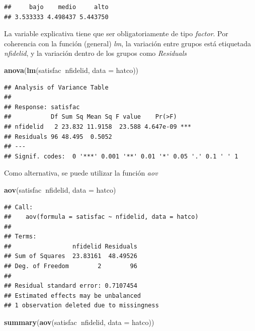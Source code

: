 \documentclass[]{book}
\newenvironment{Shaded}{\begin{snugshade}}{\end{snugshade}}
\newcommand{\DataTypeTok}[1]{\textcolor[rgb]{0.13,0.29,0.53}{#1}}
\newcommand{\KeywordTok}[1]{\textcolor[rgb]{0.13,0.29,0.53}{\textbf{#1}}}
\newcommand{\NormalTok}[1]{#1}
\newcommand{\OperatorTok}[1]{\textcolor[rgb]{0.81,0.36,0.00}{\textbf{#1}}}
\begin{document}
\begin{verbatim}
##     bajo    medio     alto 
## 3.533333 4.498437 5.443750
\end{verbatim}

La variable explicativa tiene que ser obligatoriamente de tipo \emph{factor}.
Por coherencia con la función (general) \emph{lm}, la variación entre grupos
está etiquetada \emph{nfidelid}, y la variación dentro de los grupos como
\emph{Residuals}

\begin{Shaded}
\begin{Highlighting}[]
\KeywordTok{anova}\NormalTok{(}\KeywordTok{lm}\NormalTok{(satisfac}\OperatorTok{~}\NormalTok{nfidelid, }\DataTypeTok{data =}\NormalTok{ hatco))}
\end{Highlighting}
\end{Shaded}

\begin{verbatim}
## Analysis of Variance Table
## 
## Response: satisfac
##           Df Sum Sq Mean Sq F value    Pr(>F)    
## nfidelid   2 23.832 11.9158  23.588 4.647e-09 ***
## Residuals 96 48.495  0.5052                      
## ---
## Signif. codes:  0 '***' 0.001 '**' 0.01 '*' 0.05 '.' 0.1 ' ' 1
\end{verbatim}

Como alternativa, se puede utilizar la función \emph{aov}

\begin{Shaded}
\begin{Highlighting}[]
\KeywordTok{aov}\NormalTok{(satisfac}\OperatorTok{~}\NormalTok{nfidelid, }\DataTypeTok{data =}\NormalTok{ hatco)}
\end{Highlighting}
\end{Shaded}

\begin{verbatim}
## Call:
##    aov(formula = satisfac ~ nfidelid, data = hatco)
## 
## Terms:
##                 nfidelid Residuals
## Sum of Squares  23.83161  48.49526
## Deg. of Freedom        2        96
## 
## Residual standard error: 0.7107454
## Estimated effects may be unbalanced
## 1 observation deleted due to missingness
\end{verbatim}

\begin{Shaded}
\begin{Highlighting}[]
\KeywordTok{summary}\NormalTok{(}\KeywordTok{aov}\NormalTok{(satisfac}\OperatorTok{~}\NormalTok{nfidelid, }\DataTypeTok{data =}\NormalTok{ hatco))}
\end{Highlighting}
\end{Shaded}
\end{document}

